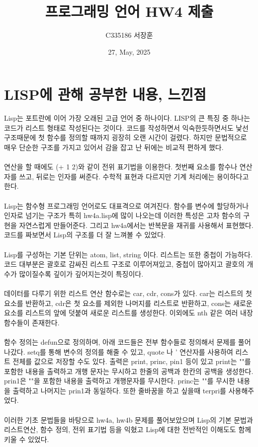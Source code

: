 \documentclass{article}
\title{프로그래밍 언어 HW4 제출}
\author{C335186 서장훈}
\date{27, May, 2025}
\begin{document}
\maketitle


\section{LISP에 관해 공부한 내용, 느낀점}
Lisp는 포트란에 이어 가장 오래된 고급 언어 중 하나이다. LISP의 큰 특징 중 하나는 코드가 리스트 형태로 작성된다는 것이다. 코드를 작성하면서 익숙한듯하면서도 낯선 구조때문에 첫 함수를 정의할 때까지 굉장히 오랜 시간이 걸렸다. 하지만 문법적으로 매우 단순한 구조를 가지고 있어서 감을 잡고 난 뒤에는 비교적 편하게 했다. \\ \\ 연산을 할 때에도 (+ 1 2)와 같이 전위 표기법을 이용한다. 첫번째 요소를 함수나 연산자를 쓰고, 뒤로는 인자를 써준다. 수학적 표현과 다르지만 기계 처리에는 용이하다고 한다. \\ \\
Lisp는 함수형 프로그래밍 언어로도 대표격으로 여겨진다. 함수를 변수에 할당하거나 인자로 넘기는 구조가 특히 hw4a.lisp에 많이 나오는데 이러한 특성은 고차 함수의 구현을 자연스럽게 만들어준다. 그리고 hw4a에서는 반복문을 재귀를 사용해서 표현했다. 코드를 짜보면서 Lisp의 구조를 더 잘 느껴볼 수 있었다. \\ \\
Lisp를 구성하는 기본 단위는 atom, list, string 이다. 리스트는 또한 중첩이 가능하다. 코드 대부분은 괄호로 감싸진 리스트 구조로 이루어져있고, 중첩이 많아지고 괄호의 개수가 많이질수록 깊이가 깊어지는것이 특징이다. \\ \\
데이터를 다루기 위한 리스트 연산 함수로는 car, cdr, cons가 있다. car는 리스트의 첫요소를 반환하고, cdr은 첫 요소를 제외한 나머지를 리스트로 반환하고, cons는 새로운 요소를 리스트의 앞에 덧붙여 새로운 리스트를 생성한다. 이외에도 nth 같은 여러 내장 함수들이 존재한다. \\ \\
함수 정의는 defun으로 정의하며, 아래 코드들은 전부 함수들로 정의해서 문제를 풀어나갔다. setq를 통해 변수의 정의를 해줄 수 있고, quote 나 ' 연산자를 사용하여 리스트 전체를 값으로 저장할 수도 있다. 출력은 print, princ, pin1 등이 있고 print는 ""를 포함한 내용을 출력하고 개행 문자는 무시하고 한줄의 공백과 한칸의 공백을 생성한다. prin1은 ""을 포함한 내용을 출력하고 개행문자를 무시한다. princ는 ""를 무시한 내용을 출력하고 나머지는 prin1과 동일하다. 또한 줄바꿈을 하고 싶을때 terpri를 사용해주었다. \\ \\
이러한 기초 문법들을 바탕으로 hw4a, hw4b 문제를 풀어보았으며 Lisp의 기본 문법과 리스트연산, 함수 정의, 전위 표기법 등을 익혔고 Lisp에 대한 전반적인 이해도도 함께 키울 수 있었다.
\end{document}
